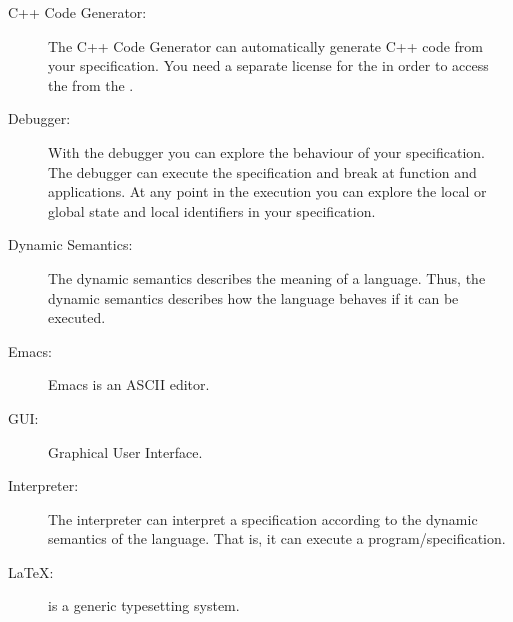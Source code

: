 \begin{description}

\item[C++ Code Generator:] The C++ Code Generator can automatically generate
  C++ code from your specification. You need a separate
  license for the  in order to access the
   from the \Toolbox.
  
  
\item[Debugger:] With the debugger you can explore the behaviour of
  your specification. The debugger can execute the specification and
  break at function and
   applications. At
  any point in the execution you can explore the local or global state
  and local identifiers in your specification.



\item[Dynamic Semantics:] The dynamic semantics describes the meaning
  of a language. Thus, the dynamic semantics describes
  how the language behaves if it can be executed.


\item[Emacs:] Emacs is an ASCII editor.


\item[GUI:] Graphical User Interface.



\item[Interpreter:] The interpreter can interpret a specification
  according to the dynamic semantics of the language. That is, it can
  execute a program/specification. 


 
 
\item[\LaTeX:] is a generic typesetting system.



\end{description}
